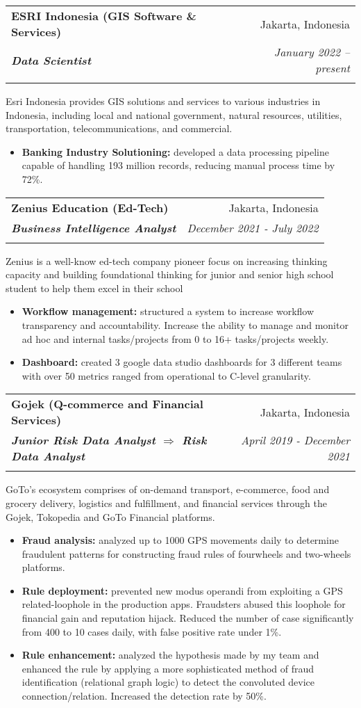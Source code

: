 \documentclass[a4paper, 11pt]{article}
\makeatletter
\newcommand{\resumeItem}[2]{
    \item\small{
        \textbf{#1}{#2 \vspace{-2pt}}
    }
}
\newcommand{\resumeSubheading}[4]{
    \vspace{-1pt}
    \begin{tabular*}{0.97\textwidth}{l@{\extracolsep{\fill}}r}
        \color{lightblue}\textbf{#1} & #2 \\
        \textbf{\textit{\small#3}} & \textit{\small #4} \\
        \textnormal{}\vspace{-5pt}
    \end{tabular*}\vspace{-5pt}
}
\newcommand{\resumeItemListStart}{\begin{itemize}[leftmargin=*]\setlength\itemsep{0em}\vspace{-1pt}}
\newcommand{\resumeItemListEnd}{\end{itemize}\vspace{-5pt}}
\makeatother
\begin{document}
    \resumeSubheading
    {ESRI Indonesia (GIS Software \& Services)}{Jakarta, Indonesia}
    {Data Scientist}{January 2022 – present}
    {Esri Indonesia provides GIS solutions and services to various industries in Indonesia, 
    including local and national government, natural resources, utilities, transportation, telecommunications, and commercial.}
    \vspace{-5pt}
    \resumeItemListStart
    \resumeItem{Banking Industry Solutioning:}{ developed a data processing pipeline capable of handling 193 million records, reducing manual process time by 72\%.}
    \resumeItemListEnd
    
    \vspace{5pt}
    \resumeSubheading
    {Zenius Education (Ed-Tech)}
    {Jakarta, Indonesia}
    {Business Intelligence Analyst}
    {December 2021 - July 2022}
    {Zenius is a well-know ed-tech company pioneer focus on increasing thinking capacity and building foundational thinking for junior
    and senior high school student to help them excel in their school}
    \vspace{-5pt}
    \resumeItemListStart
    \resumeItem{Workflow management:}{ structured a system to increase workflow transparency and accountability. 
    Increase the ability to manage and monitor ad hoc and internal tasks/projects from 0 to 16+ tasks/projects weekly.}
    \resumeItem{Dashboard:}{ created 3 google data studio dashboards for 3 different teams with 
    over 50 metrics ranged from operational to C-level granularity.}
    \resumeItemListEnd

    \vspace{5pt}
    \resumeSubheading
    {Gojek (Q-commerce and Financial Services)}
    {Jakarta, Indonesia}
    {Junior Risk Data Analyst $\Rightarrow$ Risk Data Analyst}
    {April 2019 - December 2021}
    {GoTo’s ecosystem comprises of on-demand transport, e-commerce, food and grocery delivery, logistics and fulfillment, and financial
    services through the Gojek, Tokopedia and GoTo Financial platforms.}
    \vspace{-5pt}
    \resumeItemListStart
    \resumeItem{Fraud analysis:}{ analyzed up to 1000 GPS movements daily to determine 
    fraudulent patterns for constructing fraud rules of fourwheels and two-wheels platforms.}
    \resumeItem{Rule deployment:}{ prevented new modus operandi from exploiting a GPS related-loophole in the production apps. 
    Fraudsters abused this loophole for financial gain and reputation hijack. Reduced the number of
    case significantly from 400 to 10 cases daily, with false positive rate under 1\%.}
    \resumeItem{Rule enhancement:}{ analyzed the hypothesis made by my team 
    and enhanced the rule by applying a more sophisticated method of fraud identification (relational graph logic) 
    to detect the convoluted device connection/relation. Increased the detection rate by 50\%.}
    \resumeItemListEnd
\end{document}
